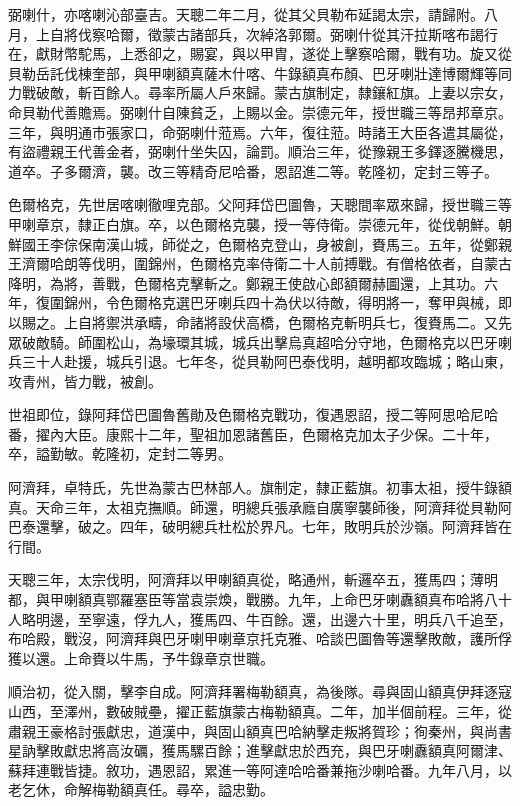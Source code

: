 \begin{pinyinscope}
弼喇什，亦喀喇沁部臺吉。天聰二年二月，從其父貝勒布延謁太宗，請歸附。八月，上自將伐察哈爾，徵蒙古諸部兵，次綽洛郭爾。弼喇什從其汗拉斯喀布謁行在，獻財幣駝馬，上悉卻之，賜宴，與以甲胄，遂從上擊察哈爾，戰有功。旋又從貝勒岳託伐棟奎部，與甲喇額真薩木什喀、牛錄額真布顏、巴牙喇壯達博爾輝等同力戰破敵，斬百餘人。尋率所屬人戶來歸。蒙古旗制定，隸鑲紅旗。上妻以宗女，命貝勒代善贍焉。弼喇什自陳貧乏，上賜以金。崇德元年，授世職三等昂邦章京。三年，與明通市張家口，命弼喇什蒞焉。六年，復往蒞。時諸王大臣各遣其屬從，有盜禮親王代善金者，弼喇什坐失囚，論罰。順治三年，從豫親王多鐸逐騰機思，道卒。子多爾濟，襲。改三等精奇尼哈番，恩詔進二等。乾隆初，定封三等子。

色爾格克，先世居喀喇徹哩克部。父阿拜岱巴圖魯，天聰間率眾來歸，授世職三等甲喇章京，隸正白旗。卒，以色爾格克襲，授一等侍衛。崇德元年，從伐朝鮮。朝鮮國王李倧保南漢山城，師從之，色爾格克登山，身被創，賚馬三。五年，從鄭親王濟爾哈朗等伐明，圍錦州，色爾格克率侍衛二十人前搏戰。有僧格依者，自蒙古降明，為將，善戰，色爾格克擊斬之。鄭親王使啟心郎額爾赫圖還，上其功。六年，復圍錦州，令色爾格克選巴牙喇兵四十為伏以待敵，得明將一，奪甲與械，即以賜之。上自將禦洪承疇，命諸將設伏高橋，色爾格克斬明兵七，復賚馬二。又先眾破敵騎。師圍松山，為壕環其城，城兵出擊烏真超哈分守地，色爾格克以巴牙喇兵三十人赴援，城兵引退。七年冬，從貝勒阿巴泰伐明，越明都攻臨城；略山東，攻青州，皆力戰，被創。

世祖即位，錄阿拜岱巴圖魯舊勛及色爾格克戰功，復遇恩詔，授二等阿思哈尼哈番，擢內大臣。康熙十二年，聖祖加恩諸舊臣，色爾格克加太子少保。二十年，卒，謚勤敏。乾隆初，定封二等男。

阿濟拜，卓特氏，先世為蒙古巴林部人。旗制定，隸正藍旗。初事太祖，授牛錄額真。天命三年，太祖克撫順。師還，明總兵張承廕自廣寧襲師後，阿濟拜從貝勒阿巴泰還擊，破之。四年，破明總兵杜松於界凡。七年，敗明兵於沙嶺。阿濟拜皆在行間。

天聰三年，太宗伐明，阿濟拜以甲喇額真從，略通州，斬邏卒五，獲馬四；薄明都，與甲喇額真鄂羅塞臣等當袁崇煥，戰勝。九年，上命巴牙喇纛額真布哈將八十人略明邊，至寧遠，俘九人，獲馬四、牛百餘。還，出邊六十里，明兵八千追至，布哈殿，戰沒，阿濟拜與巴牙喇甲喇章京托克雅、哈談巴圖魯等還擊敗敵，護所俘獲以還。上命賚以牛馬，予牛錄章京世職。

順治初，從入關，擊李自成。阿濟拜署梅勒額真，為後隊。尋與固山額真伊拜逐寇山西，至澤州，數破賊壘，擢正藍旗蒙古梅勒額真。二年，加半個前程。三年，從肅親王豪格討張獻忠，道漢中，與固山額真巴哈納擊走叛將賀珍；徇秦州，與尚書星訥擊敗獻忠將高汝礪，獲馬騾百餘；進擊獻忠於西充，與巴牙喇纛額真阿爾津、蘇拜連戰皆捷。敘功，遇恩詔，累進一等阿達哈哈番兼拖沙喇哈番。九年八月，以老乞休，命解梅勒額真任。尋卒，謚忠勤。


\end{pinyinscope}
